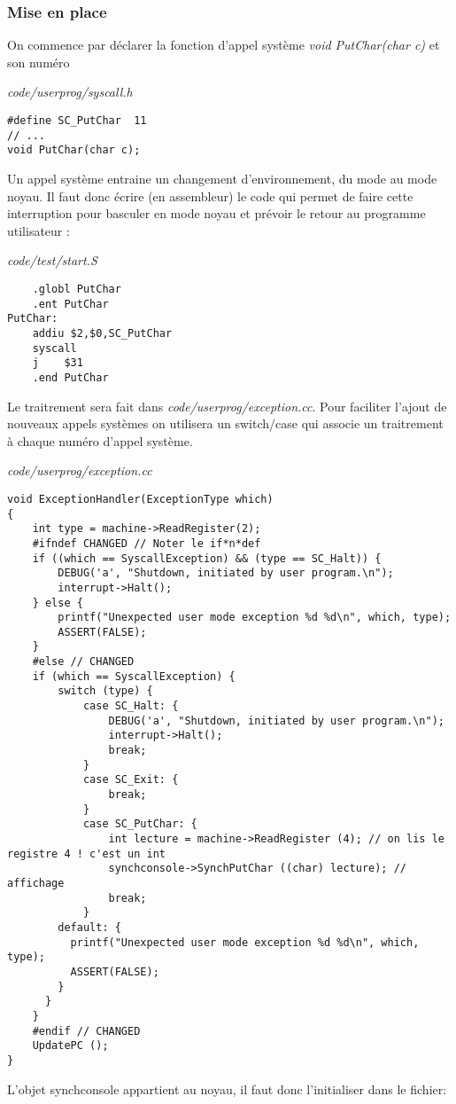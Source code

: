 \documentclass[a4paper,10pt]{article}
\begin{document}
\subsubsection{Mise en place}
On commence par déclarer la fonction d'appel système \textit{void PutChar(char
c)} et son numéro

\textit{code/userprog/syscall.h}
\begin{lstlisting}
#define SC_PutChar  11
// ...
void PutChar(char c);
\end{lstlisting}

Un appel système entraine un changement d'environnement, du mode au mode noyau.
Il faut donc écrire (en assembleur) le code qui permet de faire cette
interruption pour basculer en mode noyau et prévoir le retour au programme
utilisateur :

\textit{code/test/start.S}
\begin{lstlisting}
    .globl PutChar
    .ent PutChar
PutChar:
    addiu $2,$0,SC_PutChar
    syscall
    j    $31
    .end PutChar
\end{lstlisting}

Le traitrement sera fait dans \textit{code/userprog/exception.cc}. Pour
faciliter l'ajout de nouveaux appels systèmes on utilisera un switch/case qui
associe un traitrement à chaque numéro d'appel système.

\textit{code/userprog/exception.cc}
\begin{lstlisting}
void ExceptionHandler(ExceptionType which)
{
	int type = machine->ReadRegister(2);
	#ifndef CHANGED // Noter le if*n*def
	if ((which == SyscallException) && (type == SC_Halt)) {
		DEBUG('a', "Shutdown, initiated by user program.\n");
		interrupt->Halt();
	} else {
		printf("Unexpected user mode exception %d %d\n", which, type);
		ASSERT(FALSE);
	}
	#else // CHANGED
	if (which == SyscallException) {
		switch (type) {
			case SC_Halt: {
				DEBUG('a', "Shutdown, initiated by user program.\n");
				interrupt->Halt();
				break;
			}
			case SC_Exit: {
				break;
			}
			case SC_PutChar: {
				int lecture = machine->ReadRegister (4); // on lis le registre 4 ! c'est un int
				synchconsole->SynchPutChar ((char) lecture); // affichage
				break;
			}
        default: {
          printf("Unexpected user mode exception %d %d\n", which, type);
          ASSERT(FALSE);
        }
      }
    }
    #endif // CHANGED
    UpdatePC ();
}
\end{lstlisting}

L'objet synchconsole appartient au noyau, il faut donc l'initialiser dans le
fichier:
\end{document}
